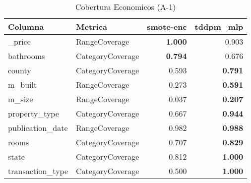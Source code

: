 \begin{table}[H]
\centering
\caption{Cobertura Economicos (A-1)}
\label{table-coverage-economicos-a-1}
\begin{tabular}{|l|l|r|r|}
\hline
\rowcolor[gray]{0.8}
Columna & Metrica & smote-enc & tddpm\_mlp \\
\hline \_price & RangeCoverage & \bfseries 1.000 & 0.903 \\
\hline bathrooms & CategoryCoverage & \bfseries 0.794 & 0.676 \\
\hline county & CategoryCoverage & 0.593 & \bfseries 0.791 \\
\hline m\_built & RangeCoverage & 0.273 & \bfseries 0.591 \\
\hline m\_size & RangeCoverage & 0.037 & \bfseries 0.207 \\
\hline property\_type & CategoryCoverage & 0.667 & \bfseries 0.944 \\
\hline publication\_date & RangeCoverage & 0.982 & \bfseries 0.988 \\
\hline rooms & CategoryCoverage & 0.707 & \bfseries 0.829 \\
\hline state & CategoryCoverage & 0.812 & \bfseries 1.000 \\
\hline transaction\_type & CategoryCoverage & 0.500 & \bfseries 1.000 \\
\hline
\end{tabular}
\end{table}
